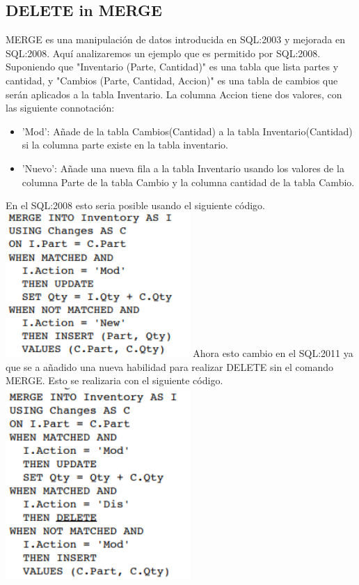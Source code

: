 \documentclass[twoside,twocolumn]{article}
\begin{document}
\subsection{DELETE in MERGE}
MERGE es una manipulación de datos introducida en SQL:2003 y mejorada en SQL:2008. Aquí analizaremos un ejemplo que es permitido por SQL:2008. Suponiendo que "Inventario (Parte, Cantidad)" es una tabla que lista partes y cantidad, y "Cambios (Parte, Cantidad, Accion)" es una tabla de cambios que serán aplicados a la tabla Inventario. La columna Accion tiene dos valores, con las siguiente connotación:
\begin{itemize}
\item 'Mod': Añade de la tabla Cambios(Cantidad) a la tabla Inventario(Cantidad) si la columna parte existe en la tabla inventario.
\item 'Nuevo': Añade una nueva fila a la tabla Inventario usando los valores de la columna Parte de la tabla Cambio y la columna cantidad de la tabla Cambio.
\end{itemize}
En el SQL:2008 esto seria posible usando el siguiente código.
\includegraphics[width=7cm]{./Imagenes/codigo1} 
Ahora esto cambio en el SQL:2011 ya que se a añadido una nueva habilidad para realizar DELETE sin el comando MERGE. Esto se realizaria con el siguiente código.
\includegraphics[width=7cm]{./Imagenes/codigo2} 
\end{document}
